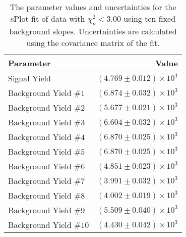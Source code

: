 
\begin{table}[ht]
    \begin{center}
        \begin{tabular}{lr}\toprule
            Parameter & Value \\\midrule
            Signal Yield & $(4.769 \pm 0.012) \times 10^{4}$ \\
            Background Yield $\#1$ & $(6.874 \pm 0.032) \times 10^{3}$ \\
            Background Yield $\#2$ & $(5.677 \pm 0.021) \times 10^{3}$ \\
            Background Yield $\#3$ & $(6.604 \pm 0.032) \times 10^{3}$ \\
            Background Yield $\#4$ & $(6.870 \pm 0.025) \times 10^{3}$ \\
            Background Yield $\#5$ & $(6.870 \pm 0.025) \times 10^{3}$ \\
            Background Yield $\#6$ & $(4.851 \pm 0.023) \times 10^{3}$ \\
            Background Yield $\#7$ & $(3.991 \pm 0.032) \times 10^{3}$ \\
            Background Yield $\#8$ & $(4.002 \pm 0.019) \times 10^{3}$ \\
            Background Yield $\#9$ & $(5.509 \pm 0.040) \times 10^{3}$ \\
            Background Yield $\#10$ & $(4.430 \pm 0.042) \times 10^{3}$ \\\bottomrule
        \end{tabular}
        \caption{The parameter values and uncertainties for the sPlot fit of data with $\chi^2_\nu < 3.00$ using ten fixed background slopes. Uncertainties are calculated using the covariance matrix of the fit.}\label{tab:splot-fit-results-chisqdof-3.00-fixed-10}
    \end{center}
\end{table}
